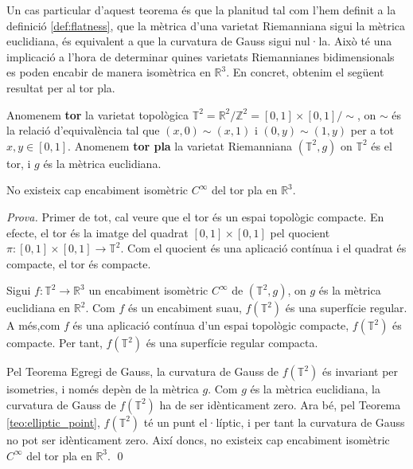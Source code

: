Un cas particular d'aquest teorema és que la planitud tal com l'hem definit a la definició \ref{def:flatness}, que la mètrica d'una varietat Riemanniana sigui la mètrica euclidiana, és equivalent a que la curvatura de Gauss sigui nul·la. Això té una implicació a l'hora de determinar quines varietats Riemannianes bidimensionals es poden encabir de manera isomètrica en $\mathbb R^3$. En concret, obtenim el següent resultat per al tor pla. 

\begin{defi}
    Anomenem \textbf{tor} la varietat topològica $\mathbb T^2 = \mathbb R^2/\mathbb Z^2 = [0,1]\times[0,1]/\sim$, on $\sim$ és la relació d'equivalència tal que $(x,0)\sim(x,1)$ i $(0,y)\sim(1,y)$ per a tot $x,y\in[0,1]$. Anomenem \textbf{tor pla} la varietat Riemanniana $(\mathbb T^2, g)$ on $\mathbb T^2$ és el tor, i $g$ és la mètrica euclidiana.
\end{defi}

\begin{teo}
    No existeix cap encabiment isomètric $C^\infty$ del tor pla en $\mathbb R^3$.
\end{teo}
{
    \color{green!50!black}
    \textit{Prova.}
    Primer de tot, cal veure que el tor és un espai topològic compacte. En efecte, el tor és la imatge del quadrat $[0,1]\times[0,1]$ pel quocient $\pi:[0,1]\times[0,1]\to\mathbb T^2$. Com el quocient és una aplicació contínua i el quadrat és compacte, el tor és compacte.

    Sigui $f:\mathbb T^2\to\mathbb R^3$ un encabiment isomètric $C^\infty$ de $(\mathbb T^2, g)$, on $g$ és la mètrica euclidiana en $\mathbb R^2$. Com $f$ és un encabiment suau, $f(\mathbb T^2)$ és una superfície regular. A més,com $f$ és una aplicació contínua d'un espai topològic compacte, $f(\mathbb T^2)$ és compacte. Per tant, $f(\mathbb T^2)$ és una superfície regular compacta.

    Pel Teorema Egregi de Gauss, la curvatura de Gauss de $f(\mathbb T^2)$ és invariant per isometries, i només depèn de la mètrica $g$. Com $g$ és la mètrica euclidiana, la curvatura de Gauss de $f(\mathbb T^2)$ ha de ser idènticament zero. Ara bé, pel Teorema \ref{teo:elliptic_point}, $f(\mathbb T^2)$ té un punt el·líptic, i per tant la curvatura de Gauss no pot ser idènticament zero. Així doncs, no existeix cap encabiment isomètric $C^\infty$ del tor pla en $\mathbb R^3$.
    \qed
}



\newpage